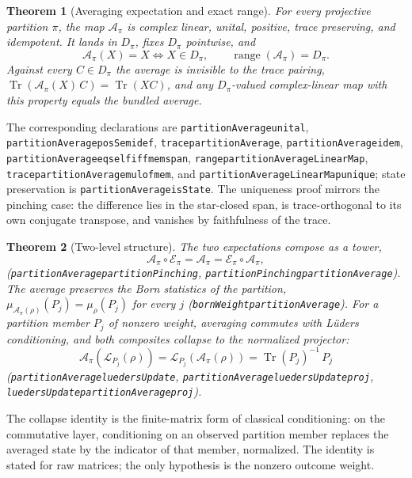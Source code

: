 \documentclass[11pt]{article}
\renewcommand{\_}{\textunderscore\allowbreak}
\newtheorem{theorem}{Theorem}
\theoremstyle{remark}
\newcommand{\Tr}{\operatorname{Tr}}
\newcommand{\pinch}{\mathcal E}
\newcommand{\avg}{\mathcal A}
\newcommand{\lued}{\mathcal L}
\begin{document}
\begin{theorem}[Averaging expectation and exact range]
\label{thm:average}
For every projective partition $\pi$, the map $\avg_\pi$ is complex linear,
unital, positive, trace preserving, and idempotent. It lands in $D_\pi$,
fixes $D_\pi$ pointwise, and
\[
 \avg_\pi(X)=X \Longleftrightarrow X\in D_\pi,
 \qquad
 \operatorname{range}(\avg_\pi)=D_\pi.
\]
Against every $C\in D_\pi$ the average is invisible to the trace pairing,
$\Tr(\avg_\pi(X)\,C)=\Tr(XC)$, and any $D_\pi$-valued complex-linear map with
this property equals the bundled average.
\end{theorem}

{\raggedright
The corresponding declarations are
\texttt{partitionAverage\_unital},
\texttt{partitionAverage\_posSemidef},
\texttt{trace\_partitionAverage},
\texttt{partitionAverage\_idem},
\texttt{partitionAverage\_eq\_self\_iff\_mem\_span},
\texttt{range\_partitionAverageLinearMap},
\texttt{trace\_partitionAverage\_mul\_of\_mem}, and
\texttt{partitionAverageLinearMap\_unique}; state preservation is
\texttt{partitionAverage\_isState}. The uniqueness proof mirrors the pinching
case: the difference lies in the star-closed span, is trace-orthogonal to its
own conjugate transpose, and vanishes by faithfulness of the trace.\par}


\begin{theorem}[Two-level structure]
\label{thm:two-level}
The two expectations compose as a tower,
\[
 \avg_\pi\circ\pinch_\pi=\avg_\pi=\pinch_\pi\circ\avg_\pi ,
\]
(\texttt{partitionAverage\_partitionPinching},
\texttt{partitionPinching\_partitionAverage}). The average preserves the
Born statistics of the partition,
$\mu_{\avg_\pi(\rho)}(P_j)=\mu_\rho(P_j)$ for every $j$
(\texttt{bornWeight\_partitionAverage}). For a partition member $P_j$ of
nonzero weight, averaging commutes with L\"uders conditioning, and both
composites collapse to the normalized projector:
\[
 \avg_\pi(\lued_{P_j}(\rho))
 =\lued_{P_j}(\avg_\pi(\rho))
 =\Tr(P_j)^{-1}\,P_j
\]
(\texttt{partitionAverage\_luedersUpdate},
\texttt{partitionAverage\_luedersUpdate\_proj},
\texttt{luedersUpdate\_partitionAverage\_proj}).
\end{theorem}

The collapse identity is the finite-matrix form of classical conditioning:
on the commutative layer, conditioning on an observed partition member
replaces the averaged state by the indicator of that member, normalized. The
identity is stated for raw matrices; the only hypothesis is the nonzero
outcome weight.
\end{document}
